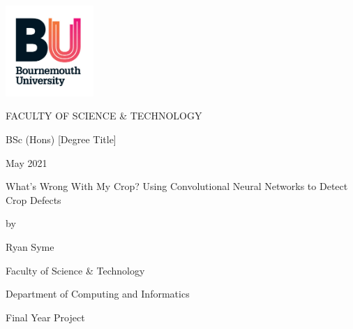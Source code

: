 \begin{titlepage}
    \thisfancypage{%
        \setlength{\fboxrule}{5pt}
        \fbox}{}
    \includegraphics[width=0.25\textwidth]{Images/unilogo}\par\vspace{0.25cm}
    \centering
	{\huge \uppercase{Faculty of Science \& Technology} \par}
	\vspace{3cm}
    {\huge BSc (Hons) [Degree Title] \par}
    {\huge May 2021 \par}
    \vspace{3cm}
    {\huge What's Wrong With My Crop? Using Convolutional Neural Networks to Detect Crop Defects \par}
    \vspace{1.5cm}
    {\huge by \par}
    \vspace{1.5cm}
    {\huge Ryan Syme \par}
    \thispagestyle{fancy}
    \renewcommand{\headrule}{}

\end{titlepage}
\restoregeometry

\newpage

\pagestyle{fancy}
\fancyhf{}
\fancyhead[R]{\thepage}
\renewcommand{\headrule}{}



\newpage
\vspace*{\fill}
\begingroup
\centering
{\Large
Faculty of Science \& Technology

Department of Computing and Informatics

Final Year Project

}
\endgroup
\vspace*{\fill}
\newpage
